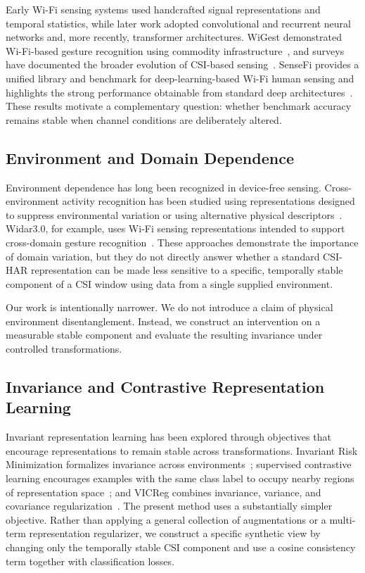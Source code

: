 \documentclass[runningheads]{llncs}
\begin{document}
Early Wi-Fi sensing systems used handcrafted signal representations and temporal statistics, while later work adopted convolutional and recurrent neural networks and, more recently, transformer architectures. WiGest demonstrated Wi-Fi-based gesture recognition using commodity infrastructure~\cite{abdelnasser2015wigest}, and surveys have documented the broader evolution of CSI-based sensing~\cite{yousefi2017survey,ma2019wifi}. SenseFi provides a unified library and benchmark for deep-learning-based Wi-Fi human sensing and highlights the strong performance obtainable from standard deep architectures~\cite{shi2022sensefi}. These results motivate a complementary question: whether benchmark accuracy remains stable when channel conditions are deliberately altered.

\subsection{Environment and Domain Dependence}

Environment dependence has long been recognized in device-free sensing. Cross-environment activity recognition has been studied using representations designed to suppress environmental variation or using alternative physical descriptors~\cite{jiang2018towards,zheng2019widar3,wang2021ei}. Widar3.0, for example, uses Wi-Fi sensing representations intended to support cross-domain gesture recognition~\cite{zheng2019widar3}. These approaches demonstrate the importance of domain variation, but they do not directly answer whether a standard CSI-HAR representation can be made less sensitive to a specific, temporally stable component of a CSI window using data from a single supplied environment.

Our work is intentionally narrower. We do not introduce a claim of physical environment disentanglement. Instead, we construct an intervention on a measurable stable component and evaluate the resulting invariance under controlled transformations.

\subsection{Invariance and Contrastive Representation Learning}

Invariant representation learning has been explored through objectives that encourage representations to remain stable across transformations. Invariant Risk Minimization formalizes invariance across environments~\cite{arjovsky2019irm}; supervised contrastive learning encourages examples with the same class label to occupy nearby regions of representation space~\cite{khosla2020supervised}; and VICReg combines invariance, variance, and covariance regularization~\cite{bardes2022vicreg}. The present method uses a substantially simpler objective. Rather than applying a general collection of augmentations or a multi-term representation regularizer, we construct a specific synthetic view by changing only the temporally stable CSI component and use a cosine consistency term together with classification losses.
\end{document}
